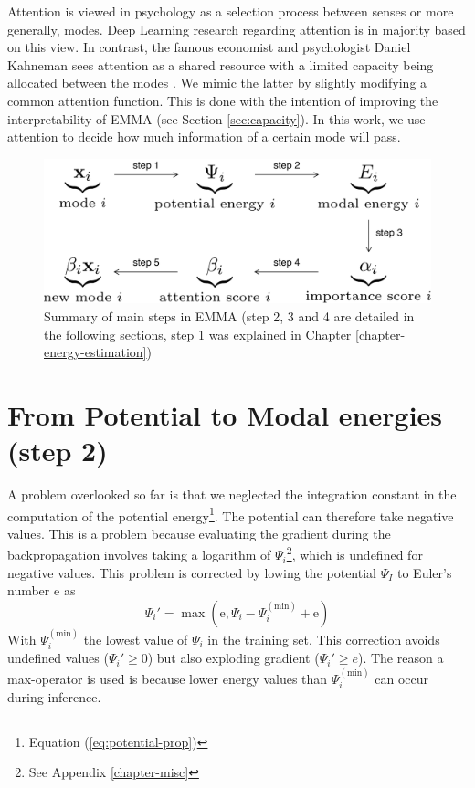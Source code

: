 Attention is viewed in psychology as a selection process between senses or more generally, modes. Deep Learning research regarding attention is in majority based on this view. In contrast, the famous economist and psychologist Daniel Kahneman sees attention as a shared resource with a limited capacity being allocated between the modes \citep{attention-is-effort}. We mimic the latter by slightly modifying a common attention function. This is done with the intention of improving the interpretability of EMMA (see Section \ref{sec:capacity}). In this work, we use attention to decide how much information of a certain mode will pass.

\begin{figure}[!ht]
\centering
\includegraphics[scale=0.4]{figures/framework}
\caption[Summary of main steps in EMMA]{Summary of main steps in EMMA (step 2, 3 and 4 are detailed in the following sections, step 1 was explained in Chapter \ref{chapter-energy-estimation})}
\end{figure}


\section{From Potential to Modal energies (step 2)}
A problem overlooked so far is that we neglected the integration constant in the computation of the potential energy\footnote{Equation (\ref{eq:potential-prop})}. The potential can therefore take negative values. This is a problem because evaluating the gradient during the backpropagation involves taking a logarithm of $\Psi_i$\footnote{See Appendix \ref{chapter-misc}}, which is undefined for negative values. This problem is corrected by lowing the potential $\Psi_I$ to Euler's number $\mathrm{e}$ as
\begin{equation}
\Psi_i' = \max(\mathrm{e}, \Psi_i - \Psi_i^{(\text{min})} + \mathrm{e})
\end{equation}
With $\Psi_i^{(\text{min})}$ the lowest value of $\Psi_i$ in the training set. This correction avoids undefined values ($\Psi_i' \geq 0$) but also exploding gradient ($\Psi_i' \geq e$). The reason a max-operator is used is because lower energy values than $\Psi_i^{(\text{min})}$  can occur during inference.

